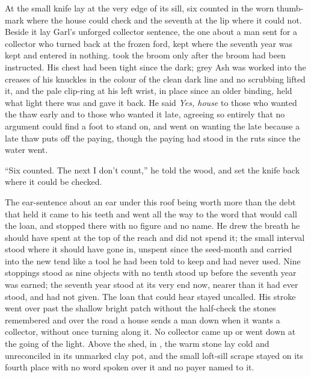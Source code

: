 \scenebreak

At  the small knife lay at the very edge of its sill, six counted in the worn thumb-mark where the house could check and the seventh at the lip where it could not. Beside it lay Garl's unforged collector sentence, the one about a man sent for a collector who turned back at the frozen ford, kept where the seventh year was kept and entered in nothing.  took the broom only after the broom had been instructed. His chest had been tight since the dark; grey Ash was worked into the creases of his knuckles in the colour of the clean dark line and no scrubbing lifted it, and the pale clip-ring at his left wrist, in place since an older binding, held what light there was and gave it back. He said \emph{Yes, house} to those who wanted the thaw early and to those who wanted it late, agreeing so entirely that no argument could find a foot to stand on, and went on wanting the late because a late thaw puts off the paying, though the paying had stood in the ruts since the water went.

“Six counted. The next I don't count,” he told the wood, and set the knife back where it could be checked.

The ear-sentence about an ear under this roof being worth more than the debt that held it came to his teeth and went all the way to the word that would call the loan, and stopped there with no figure and no name. He drew the breath he should have spent at the top of the reach and did not spend it; the small interval stood where it should have gone in, unspent since the seed-month and carried into the new tend like a tool he had been told to keep and had never used. Nine stoppings stood as nine objects with no tenth stood up before the seventh year was earned; the seventh year stood at its very end now, nearer than it had ever stood, and had not given. The loan that could hear stayed uncalled. His stroke went over  past the shallow bright patch without the half-check the stones remembered and over the road a house sends a man down when it wants a collector, without once turning along it. No collector came up or went down  at the going of the light. Above the shed, in , the warm stone lay cold and unreconciled in its unmarked clay pot, and the small loft-sill scrape stayed on its fourth place with no word spoken over it and no payer named to it.

\scenebreak

